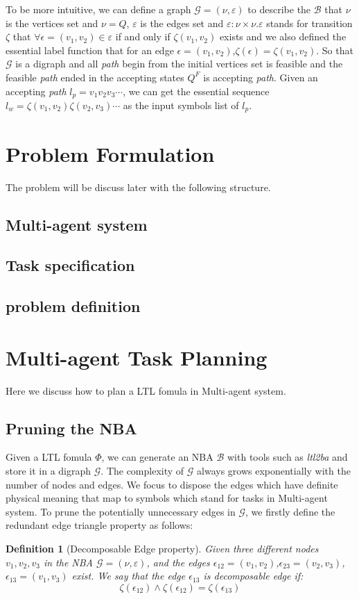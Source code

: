 \documentclass[journal]{IEEEtran}
\newtheorem{definition}{Definition}
\begin{document}
 To be more intuitive, we can define a graph $\mathcal{G}=(\nu,\varepsilon)$ to describe the $\mathcal{B}$ that $\nu$ is the vertices set and $\nu = Q$, $\varepsilon$ is the edges set and $\varepsilon:\nu\times\nu$.$\varepsilon$ stands for transition $\zeta$ that  $\forall\epsilon=(v_1,v_2)\in\varepsilon$ if and only if $\zeta(v_1,v_2)$ exists and we also defined the essential label function that for an edge $\epsilon=(v_1,v_2)$,$\zeta(\epsilon)=\zeta(v_1,v_2)$.
So that $\mathcal{G}$ is a digraph and all \emph{path} begin from the initial vertices set is feasible and the feasible \emph{path} ended in the accepting states $Q^F$ is accepting \emph{path}. Given an accepting \emph{path} $l_{p}=v_1v_2v_3\cdots$, we can get the essential sequence $l_w=\zeta(v_1,v_2)\zeta(v_2,v_3)\cdots$ as the input symbols list of $l_p$.





\section{Problem Formulation}
 The problem will be discuss later with the following structure.
\subsection{Multi-agent system}
\subsection{Task specification}
\subsection{problem definition}

\section{Multi-agent Task Planning}
Here we discuss how to plan a LTL fomula in Multi-agent system. 
\subsection{Pruning the NBA}
Given a LTL fomula $\varPhi$, we can generate an NBA $ \mathcal{B}$ with tools such as \emph{ltl2ba} and store it in a digraph $\mathcal{G}$. The complexity of $\mathcal{G}$ always grows exponentially with the number of nodes and edges. We focus to dispose the edges which have definite physical meaning that map to symbols which stand for tasks in Multi-agent system. To prune the potentially unnecessary edges in $\mathcal{G}$, we firstly define the redundant edge triangle property as follows:
	\begin{definition}[Decomposable Edge property]
		Given three different nodes $v_1,v_2,v_3$ in the NBA $\mathcal{G}=(\nu,\varepsilon)$, and the edges $\epsilon_{12}=(v_1,v_2)$,$\epsilon_{23}=(v_2,v_3)$,$\epsilon_{13}=(v_1,v_3)$ exist. We say that the edge $\epsilon_{13}$ is decomposable edge if:
		$$\zeta(\epsilon_{12})\land \zeta(\epsilon_{12})=\zeta(\epsilon_{13})$$
	\end{definition}
\end{document}
